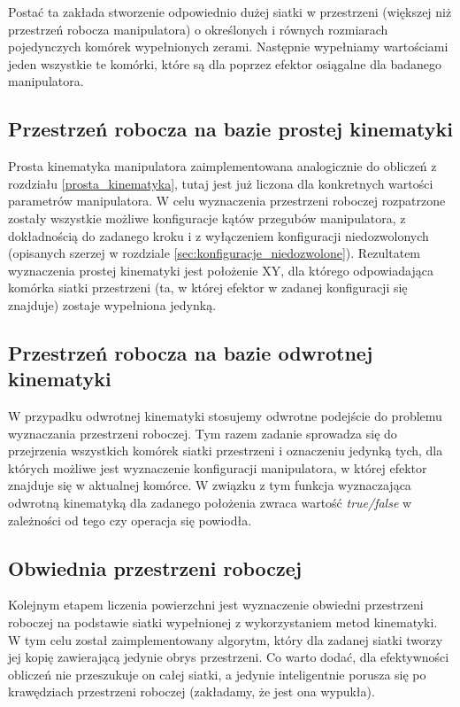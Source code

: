 \documentclass[printmode]{mgr}
\begin{document}
Postać ta zakłada stworzenie odpowiednio dużej siatki w przestrzeni (większej niż
przestrzeń robocza manipulatora) o określonych i równych rozmiarach pojedynczych komórek
wypełnionych zerami. Następnie wypełniamy wartościami jeden wszystkie te komórki, które są dla
poprzez efektor osiągalne dla badanego manipulatora. 

\subsection{Przestrzeń robocza na bazie prostej kinematyki}
Prosta kinematyka manipulatora zaimplementowana analogicznie do obliczeń z rozdziału \ref{prosta_kinematyka},
tutaj jest już liczona dla konkretnych wartości parametrów manipulatora. 
W celu wyznaczenia przestrzeni roboczej rozpatrzone zostały wszystkie możliwe konfiguracje
kątów przegubów manipulatora, z dokładnością do zadanego kroku i z wyłączeniem konfiguracji
niedozwolonych (opisanych szerzej w rozdziale \ref{sec:konfiguracje_niedozwolone}).
Rezultatem wyznaczenia prostej kinematyki jest położenie XY, dla którego odpowiadająca komórka
siatki przestrzeni (ta, w której efektor w zadanej konfiguracji się znajduje)
zostaje wypełniona jedynką. 

\subsection{Przestrzeń robocza na bazie odwrotnej kinematyki}
W przypadku odwrotnej kinematyki stosujemy odwrotne podejście do problemu wyznaczania przestrzeni roboczej. 
Tym razem zadanie sprowadza się do przejrzenia wszystkich komórek siatki przestrzeni i oznaczeniu
jedynką tych, dla których możliwe jest wyznaczenie konfiguracji manipulatora, w której efektor
znajduje się w aktualnej komórce. W związku z tym funkcja wyznaczająca odwrotną kinematyką
dla zadanego położenia zwraca wartość \emph{true/false} w zależności od tego czy operacja
się powiodła. 

\subsection{Obwiednia przestrzeni roboczej}
Kolejnym etapem liczenia powierzchni jest wyznaczenie obwiedni przestrzeni roboczej na podstawie
siatki wypełnionej z wykorzystaniem metod kinematyki. W tym celu został zaimplementowany algorytm, 
który dla zadanej siatki tworzy jej kopię zawierającą jedynie obrys przestrzeni. Co warto dodać,
dla efektywności obliczeń nie przeszukuje on całej siatki, a jedynie inteligentnie porusza się
po krawędziach przestrzeni roboczej (zakładamy, że jest ona wypukła). 
\end{document}
